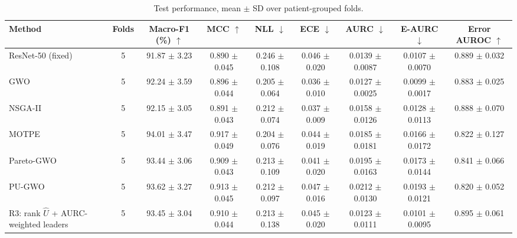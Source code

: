 \begin{table}[t]
\centering
\caption{Test performance, mean $\pm$ SD over patient-grouped folds.}
\label{tab:table3_main_results}
\small
\begin{tabular}{lcccccccc}
\toprule
Method & Folds & Macro-F1 (\%) $\uparrow$ & MCC $\uparrow$ & NLL $\downarrow$ & ECE $\downarrow$ & AURC $\downarrow$ & E-AURC $\downarrow$ & Error AUROC $\uparrow$ \\
\midrule
ResNet-50 (fixed) & 5 & 91.87 $\pm$ 3.23 & 0.890 $\pm$ 0.045 & 0.246 $\pm$ 0.108 & 0.046 $\pm$ 0.020 & 0.0139 $\pm$ 0.0087 & 0.0107 $\pm$ 0.0070 & 0.889 $\pm$ 0.032 \\
GWO & 5 & 92.24 $\pm$ 3.59 & 0.896 $\pm$ 0.044 & 0.205 $\pm$ 0.064 & 0.036 $\pm$ 0.010 & 0.0127 $\pm$ 0.0025 & 0.0099 $\pm$ 0.0017 & 0.883 $\pm$ 0.025 \\
NSGA-II & 5 & 92.15 $\pm$ 3.05 & 0.891 $\pm$ 0.043 & 0.212 $\pm$ 0.074 & 0.037 $\pm$ 0.009 & 0.0158 $\pm$ 0.0126 & 0.0128 $\pm$ 0.0113 & 0.888 $\pm$ 0.070 \\
MOTPE & 5 & 94.01 $\pm$ 3.47 & 0.917 $\pm$ 0.049 & 0.204 $\pm$ 0.076 & 0.044 $\pm$ 0.019 & 0.0185 $\pm$ 0.0181 & 0.0166 $\pm$ 0.0172 & 0.822 $\pm$ 0.127 \\
Pareto-GWO & 5 & 93.44 $\pm$ 3.06 & 0.909 $\pm$ 0.043 & 0.213 $\pm$ 0.109 & 0.041 $\pm$ 0.020 & 0.0195 $\pm$ 0.0163 & 0.0173 $\pm$ 0.0144 & 0.841 $\pm$ 0.066 \\
PU-GWO & 5 & 93.62 $\pm$ 3.27 & 0.913 $\pm$ 0.045 & 0.212 $\pm$ 0.097 & 0.047 $\pm$ 0.016 & 0.0212 $\pm$ 0.0130 & 0.0193 $\pm$ 0.0121 & 0.820 $\pm$ 0.052 \\
R3: rank $\hat{U}$ + AURC-weighted leaders & 5 & 93.45 $\pm$ 3.04 & 0.910 $\pm$ 0.044 & 0.213 $\pm$ 0.138 & 0.045 $\pm$ 0.020 & 0.0123 $\pm$ 0.0111 & 0.0101 $\pm$ 0.0095 & 0.895 $\pm$ 0.061 \\
\bottomrule
\end{tabular}
\end{table}
